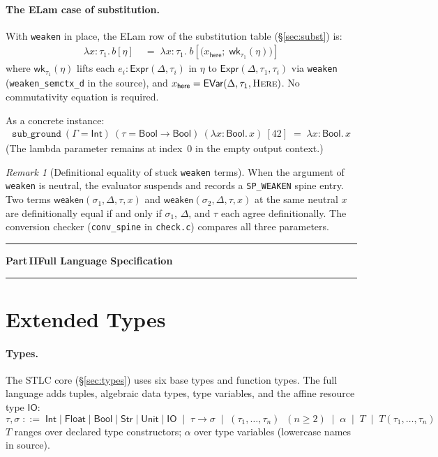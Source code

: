 \documentclass[10pt,a4paper]{article}
\newcommand{\TInt}{\mathsf{Int}}
\newcommand{\TFlt}{\mathsf{Float}}
\newcommand{\TBool}{\mathsf{Bool}}
\newcommand{\TStr}{\mathsf{Str}}
\newcommand{\TUnit}{\mathsf{Unit}}
\newcommand{\TIO}{\mathsf{IO}}
\newcommand{\subst}[2]{#1[#2]}
\theoremstyle{plain}
\theoremstyle{definition}
\theoremstyle{remark}
\newtheorem{remark}{Remark}
\begin{document}
\paragraph{The ELam case of substitution.}
With \texttt{weaken} in place, the ELam row of the substitution table
(\S\ref{sec:subst}) is:
\begin{align*}
  \subst{\lambda x{:}\tau_1.\,b}{\eta}
  &\;=\;
  \lambda x{:}\tau_1.\;
  \subst{b}{\bigl(x_{\mathsf{here}};\;\mathsf{wk}_{\tau_1}(\eta)\bigr)}
\end{align*}
where $\mathsf{wk}_{\tau_1}(\eta)$ lifts each $e_i:\mathsf{Expr}(\Delta,\tau_i)$
in $\eta$ to $\mathsf{Expr}(\Delta,\tau_1,\tau_i)$ via \texttt{weaken}
(\texttt{weaken\_semctx\_d} in the source), and
$x_{\mathsf{here}}=\mathsf{EVar}(\Delta,\tau_1,\textsc{Here})$.
No commutativity equation is required.

As a concrete instance:
\begin{align*}
\texttt{sub\_ground}\ (\Gamma{=}\TInt)\ (\tau{=}\TBool{\to}\TBool)
\ (\lambda x{:}\TBool.\,x)\ [42]
\;=\;
\lambda x{:}\TBool.\,x
\end{align*}
(The lambda parameter remains at index~0 in the empty output context.)

\begin{remark}[Definitional equality of stuck \texttt{weaken} terms]
When the argument of \texttt{weaken} is neutral, the evaluator suspends
and records a \texttt{SP\_WEAKEN} spine entry.  Two terms
$\mathsf{weaken}(\sigma_1,\Delta,\tau,x)$ and
$\mathsf{weaken}(\sigma_2,\Delta,\tau,x)$ at the same neutral $x$ are
definitionally equal if and only if $\sigma_1$, $\Delta$, and $\tau$
each agree definitionally.  The conversion checker (\texttt{conv\_spine}
in \texttt{check.c}) compares all three parameters.
\end{remark}


\medskip\noindent\rule{\linewidth}{0.4pt}
{\centering\normalsize\bfseries Part\,II\quad Full Language Specification\par}
\noindent\rule{\linewidth}{0.4pt}\medskip

\section{Extended Types}
\label{sec:types-ext}

\paragraph{Types.}
The STLC core (\S\ref{sec:types}) uses six base types and function types.
The full language adds tuples, algebraic data types, type variables, and the
affine resource type $\TIO$:
\[
\tau,\sigma \;::=\;
  \TInt \mid \TFlt \mid \TBool \mid \TStr \mid \TUnit \mid \TIO
  \;\mid\; \tau\to\sigma
  \;\mid\; (\tau_1,\ldots,\tau_n)\;\;(n\ge 2)
  \;\mid\; \alpha
  \;\mid\; T \;\mid\; T(\tau_1,\ldots,\tau_n)
\]
$T$ ranges over declared type constructors; $\alpha$ over type variables
(lowercase names in source).
\end{document}
